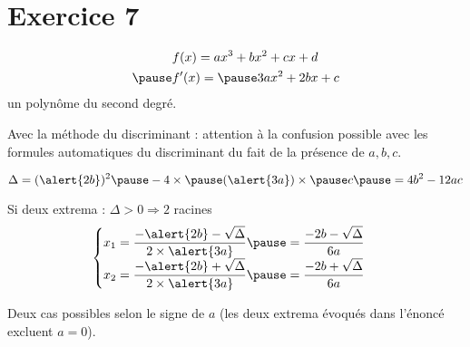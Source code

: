 \documentclass[9pt,handout,professionalfonts,hyperref]{beamer}
\begin{document}
\begin{frame}
\begin{adjustbox}{width=\textwidth,center}
\end{adjustbox}
\end{frame}

\section{Exercice 7}

\begin{frame}
\[\begin{aligned}
&f(x)=ax^3+bx^2+cx+d \\
\pause &f'(x)= \pause 3ax^2+2bx+c
\end{aligned}\]\newline
un polynôme du second degré.\newline

\pause Avec la méthode du discriminant : \alert{attention à la confusion possible avec les formules automatiques du discriminant du fait de la présence de $a,b,c$.}

$$\Delta = (\alert{2b})^2\pause -4\times\pause (\alert{3a})\times\pause  c \pause = 4b^2 -12ac$$
\pause

\pause Si deux extrema : $\Delta>0 \Rightarrow 2$ racines %
\pause
\[\begin{cases}
x_1 = \dfrac{-\alert{2b}-\sqrt\Delta}{2\times \alert{3a}}\pause=\dfrac{-2b-\sqrt\Delta}{6a} \\
x_2 = \dfrac{-\alert{2b}+\sqrt\Delta}{2\times \alert{3a}}\pause =\dfrac{-2b+\sqrt\Delta}{6a}
\end{cases}\]\newline

Deux cas possibles selon le signe de $a$ (les deux extrema évoqués dans l'énoncé excluent $a=0$).
\end{frame}
\end{document}
